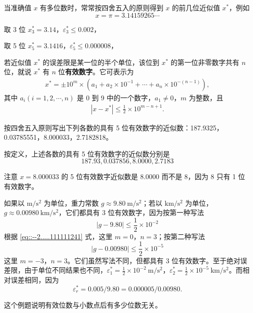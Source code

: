 \documentclass[../../main.tex]{subfiles}
\begin{document}
\begin{example}
当准确值 $x$ 有多位数时，常常按四舍五入的原则得到 $x$ 的前几位近似值 $x^*$，例如 
\[
x = \pi = 3.14159265\cdots
\]

取 3 位  $x_3^* = 3.14$，$\varepsilon_3^* \leqslant 0.002$，

取 5 位  $x_5^* = 3.1416$，$\varepsilon_5^* \leqslant 0.000008$，
\end{example}

\begin{definition}[有效数字]
若近似值 $x^*$ 的误差限是某一位的半个单位，该位到 $x^*$ 的第一位非零数字共有 $n$ 位，就说 $x^*$ 有 $n$ 位\textbf{有效数字}。它可表示为 
\begin{align}
x^* = \pm 10^m \times (a_1 + a_2 \times 10^{-1} + \cdots + a_n \times 10^{-(n - 1)}),\label{eq::--2.....111111241}
\end{align}
其中 $a_i (i = 1, 2, \cdots, n)$ 是 0 到 9 中的一个数字，$a_1 \neq 0$，$m$ 为整数，且 
\begin{align}
| x - x^* | \leqslant \frac{1}{2} \times 10^{m - n + 1}.\label{eq::--2.....111111242}
\end{align}
\end{definition}

\begin{example}
按四舍五入原则写出下列各数的具有 5 位有效数字的近似数：187.9325，0.03785551，8.000033，2.7182818。
\end{example}
\begin{solution}
按定义，上述各数的具有 5 位有效数字的近似数分别是 
\[
187.93, 0.037856, 8.0000, 2.7183
\]

注意 $x = 8.000033$ 的 5 位有效数字近似数是 8.0000 而不是 8，因为 8 只有 1 位有效数字。

\end{solution}

\begin{example}
如果以 $\mathrm{m/s^2}$ 为单位，重力常数 $g \approx 9.80\ \mathrm{m/s^2}$；若以 $\mathrm{km/s^2}$ 为单位，$g \approx 0.00980\ \mathrm{km/s^2}$，它们都具有 3 位有效数字，因为按第一种写法 
\[
| g - 9.80 | \leqslant \frac{1}{2} \times 10^{-2}
\]
根据 \eqref{eq::--2.....111111241} 式，这里 $m = 0$，$n = 3$；按第二种写法 
\[
| g - 0.00980 | \leqslant \frac{1}{2} \times 10^{-5}
\]
这里 $m = -3$，$n = 3$。它们虽然写法不同，但都具有 3 位有效数字。至于绝对误差限，由于单位不同结果也不同，$\varepsilon_1^* = \frac{1}{2} \times 10^{-2}\ \mathrm{m/s^2}$，$\varepsilon_2^* = \frac{1}{2} \times 10^{-5}\ \mathrm{km/s^2}$。而相对误差相同，因为 
\[
\varepsilon_r^* = 0.005 / 9.80 = 0.000005 / 0.00980.
\]
\end{example}
\begin{note}
这个例题说明有效位数与小数点后有多少位数无关。
\end{note}
\end{document}
